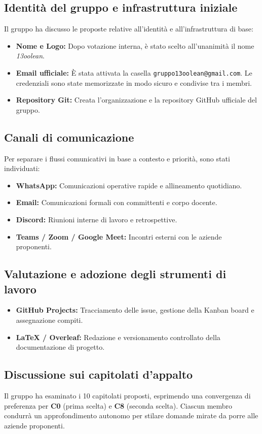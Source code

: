 \documentclass[11pt, a4paper]{article}
\newcommand{\GroupName}{13oolean}
\begin{document}
\subsection{Identità del gruppo e infrastruttura iniziale}
Il gruppo ha discusso le proposte relative all'identità e all'infrastruttura di base:
\begin{itemize}
    \item \textbf{Nome e Logo:} Dopo votazione interna, è stato scelto all'unanimità il nome \textit{\GroupName}.
    \item \textbf{Email ufficiale:} È stata attivata la casella \texttt{gruppo13oolean@gmail.com}. Le credenziali sono state memorizzate in modo sicuro e condivise tra i membri.
    \item \textbf{Repository Git:} Creata l'organizzazione e la repository GitHub ufficiale del gruppo.
\end{itemize}

\subsection{Canali di comunicazione}
Per separare i flussi comunicativi in base a contesto e priorità, sono stati individuati:
\begin{itemize}
    \item \textbf{WhatsApp:} Comunicazioni operative rapide e allineamento quotidiano.
    \item \textbf{Email:} Comunicazioni formali con committenti e corpo docente.
    \item \textbf{Discord:} Riunioni interne di lavoro e retrospettive.
    \item \textbf{Teams / Zoom / Google Meet:} Incontri esterni con le aziende proponenti.
\end{itemize}

\subsection{Valutazione e adozione degli strumenti di lavoro}
\begin{itemize}
    \item \textbf{GitHub Projects:} Tracciamento delle issue, gestione della Kanban board e assegnazione compiti.
    \item \textbf{LaTeX / Overleaf:} Redazione e versionamento controllato della documentazione di progetto.
\end{itemize}

\subsection{Discussione sui capitolati d'appalto}
Il gruppo ha esaminato i 10 capitolati proposti, esprimendo una convergenza di preferenza per \textbf{C0} (prima scelta) e \textbf{C8} (seconda scelta). Ciascun membro condurrà un approfondimento autonomo per stilare domande mirate da porre alle aziende proponenti.
\clearpage
\end{document}
